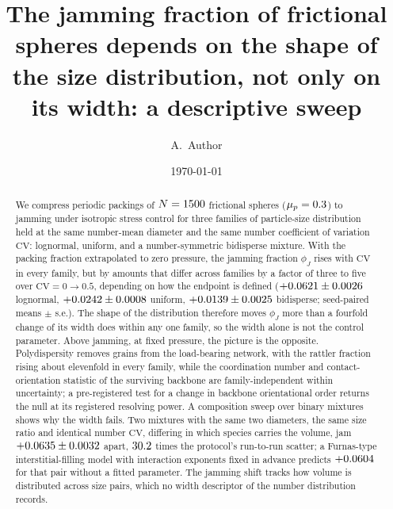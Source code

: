 \documentclass[reprint,aps,pre,amsmath,amssymb,superscriptaddress,longbibliography,nofootinbib,floatfix]{revtex4-2}
\newcommand{\phiJ}{\phi_{J}}
\newcommand{\mup}{\mu_{p}}
\newcommand{\CV}{\mathrm{CV}}
\begin{document}
\title{The jamming fraction of frictional spheres depends on the shape of the size distribution, not only on its width: a descriptive sweep}

\author{A.~Author} %

\date{\today}

\begin{abstract}
We compress periodic packings of $N=1500$ frictional spheres ($\mup=\muP$) to jamming under isotropic stress control for three families of particle-size distribution held at the same number-mean diameter and the same number coefficient of variation $\CV$: lognormal, uniform, and a number-symmetric bidisperse mixture.
With the packing fraction extrapolated to zero pressure, the jamming fraction $\phiJ$ rises with $\CV$ in every family, but by amounts that differ across families by a factor of three to five over $\CV=0\to0.5$, depending on how the endpoint is defined ($+0.0621\pm0.0026$ lognormal, $+0.0242\pm0.0008$ uniform, $+0.0139\pm0.0025$ bidisperse; seed-paired means $\pm$ s.e.).
The shape of the distribution therefore moves $\phiJ$ more than a fourfold change of its width does within any one family, so the width alone is not the control parameter.
Above jamming, at fixed pressure, the picture is the opposite.
Polydispersity removes grains from the load-bearing network, with the rattler fraction rising about elevenfold in every family, while the coordination number and contact-orientation statistic of the surviving backbone are family-independent within uncertainty; a pre-registered test for a change in backbone orientational order returns the null at its registered resolving power.
A composition sweep over binary mixtures shows why the width fails.
Two mixtures with the same two diameters, the same size ratio and identical number $\CV$, differing in which species carries the volume, jam $+0.0635\pm0.0032$ apart, $30.2$ times the protocol's run-to-run scatter; a Furnas-type interstitial-filling model with interaction exponents fixed in advance predicts $+0.0604$ for that pair without a fitted parameter.
The jamming shift tracks how volume is distributed across size pairs, which no width descriptor of the number distribution records.
\end{abstract}

\maketitle
\end{document}

